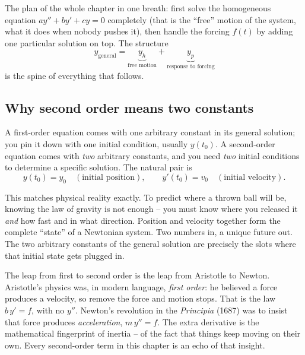 \begin{focusbox}
The plan of the whole chapter in one breath: first solve the homogeneous
equation $a y'' + b y' + c y = 0$ completely (that is the ``free'' motion of the
system, what it does when nobody pushes it), then handle the forcing $f(t)$ by
adding one particular solution on top. The structure
\[
  y_{\text{general}} = \underbrace{y_h}_{\text{free motion}} + \underbrace{y_p}_{\text{response to forcing}}
\]
is the spine of everything that follows.
\end{focusbox}

\subsection*{Why second order means two constants}

A first-order equation comes with one arbitrary constant in its general
solution; you pin it down with one initial condition, usually $y(t_0)$. A
second-order equation comes with \emph{two} arbitrary constants, and you need
\emph{two} initial conditions to determine a specific solution. The natural pair
is
\[
  y(t_0) = y_0 \quad(\text{initial position}), \qquad
  y'(t_0) = v_0 \quad(\text{initial velocity}).
\]

\begin{intuitionbox}
This matches physical reality exactly. To predict where a thrown ball will be,
knowing the law of gravity is not enough -- you must know where you released it
\emph{and} how fast and in what direction. Position and velocity together form
the complete ``state'' of a Newtonian system. Two numbers in, a unique future
out. The two arbitrary constants of the general solution are precisely the slots
where that initial state gets plugged in.
\end{intuitionbox}

\begin{historybox}
The leap from first to second order is the leap from Aristotle to Newton.
Aristotle's physics was, in modern language, \emph{first order}: he believed a
force produces a velocity, so remove the force and motion stops. That is the law
$b\,y' = f$, with no $y''$. Newton's revolution in the \emph{Principia} (1687)
was to insist that force produces \emph{acceleration}, $m\,y'' = f$. The extra
derivative is the mathematical fingerprint of inertia -- of the fact that things
keep moving on their own. Every second-order term in this chapter is an echo of
that insight.
\end{historybox}

